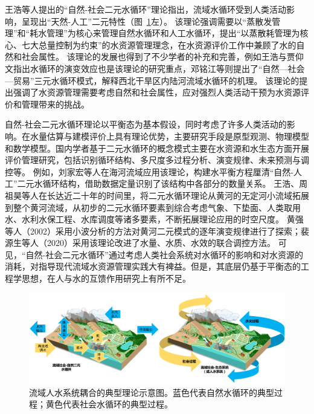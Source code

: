 王浩等人提出的“自然-社会二元水循环”理论指出，流域水循环受到人类活动影响，呈现出“天然-人工”二元特性\cite{wang2006}（图~\ref{ch1:fig:two_water_cycle}左）。
该理论强调需要以“蒸散发管理”和“耗水管理”为核心来管理自然水循环和人工水循环，提出“以蒸散耗管理为核心、七大总量控制为约束”的水资源管理理念，在水资源评价工作中兼顾了水的自然和社会属性\cite{wang2010}。
该理论的发展也得到了不少学者的补充和完善，例如王浩与贾仰文指出水循环的演变效应也是该理论的研究重点\cite{wang2016}，邓铭江等则提出了“自然—社会—贸易”三元水循环模式，解释西北干旱区内陆河流域水循环的机理\cite{deng2020}。
该理论的提出强调了水资源管理需要考虑自然和社会属性，应对强烈人类活动干预为水资源评价和管理带来的挑战。

自然-社会二元水循环理论以平衡态为基本假设，同时考虑了许多人类活动的影响。在水量估算与建模评价上具有理论优势，主要研究手段是原型观测、物理模型和数学模型。国内学者基于二元水循环的概念模式主要在水资源和水生态方面开展评价管理研究，包括识别循环结构、多尺度多过程分析、演变规律、未来预测与调控等\cite{wang2016}。
例如，刘家宏等人在海河流域应用该理论，构建水平衡方程厘清“自然-人工”二元水循环结构，借助数据定量识别了该结构中各部分的数量关系\cite{liu2010}。
王浩\cite{wang2004}、周祖昊\cite{zhou2022a}等人在长达近二十年的时间里，将二元水循环理论从黄河的无定河小流域拓展到整个黄河流域，从初步的二元水循环要素到综合考虑气象、下垫面、人类取用水、水利水保工程、水库调度等诸多要素，不断拓展理论应用的时空尺度。
黄强等人（2002）采用小波分析的方法对黄河二元模式的逐年演变规律进行了探索\cite{huang2002}；裴源生等人（2020）采用该理论改进了水量、水质、水效的联合调控方法\cite{pei2020}。
可见，“自然-社会二元水循环”通过考虑人类社会系统对水循环的影响和对水资源的消耗，对指导现代流域水资源管理实践大有裨益。但是，其底层仍基于平衡态的工程学思想，在人与水的互馈作用研究上有所不足。

\begin{figure}[htb]
    \centering
    \includegraphics[width=\textwidth]{img/ch1/ch1_two_water_cycle.png}
    \caption[流域人水系统耦合的典型理论示意图]{流域人水系统耦合的典型理论示意图\cite{wang2006,dibaldassarre2015}。蓝色代表自然水循环的典型过程；黄色代表社会水循环的典型过程。}\label{ch1:fig:two_water_cycle}
\end{figure}

